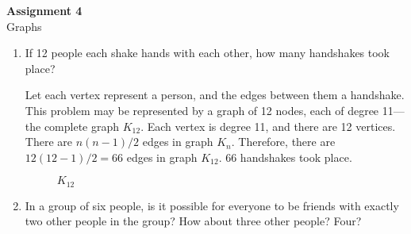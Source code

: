 \documentclass[11pt, letterpaper, includehead]{article}
\theoremstyle{plain}
\theoremstyle{mydefinition}
\theoremstyle{myproperty}
\begin{document}
\pagestyle{fancy}
\fancyhead{}
\fancyfoot{}

\begin{center}
    \Large{\textbf{Assignment 4}}\\
    \Large{Graphs}
\end{center}

\begin{enumerate}[label=\textbf{\arabic*}., leftmargin=*]
    \item If 12 people each shake hands with each other, how many handshakes
          took
          place?

          \begin{multicols}{2}
              Let each vertex represent a person, and the edges between them a
              handshake.
              This problem may be represented by a graph of 12 nodes, each of
              degree 11---the
              complete graph $K_{12}$. Each vertex is degree 11, and there are
              12 vertices.
              There are $n(n-1)/2$ edges in graph $K_n$. Therefore, there are
              $12(12-1)/2 = 66$
              edges in graph $K_{12}$. 66 handshakes took place.

              \columnbreak
              \begin{figure}[H]
                  \centering
                  \caption{$K_{12}$}
              \end{figure}
          \end{multicols}

    \item In a group of six people, is it possible for everyone to be friends
          with
          exactly two other people in the group? How about three other people?
          Four?


\end{enumerate}
\end{document}
